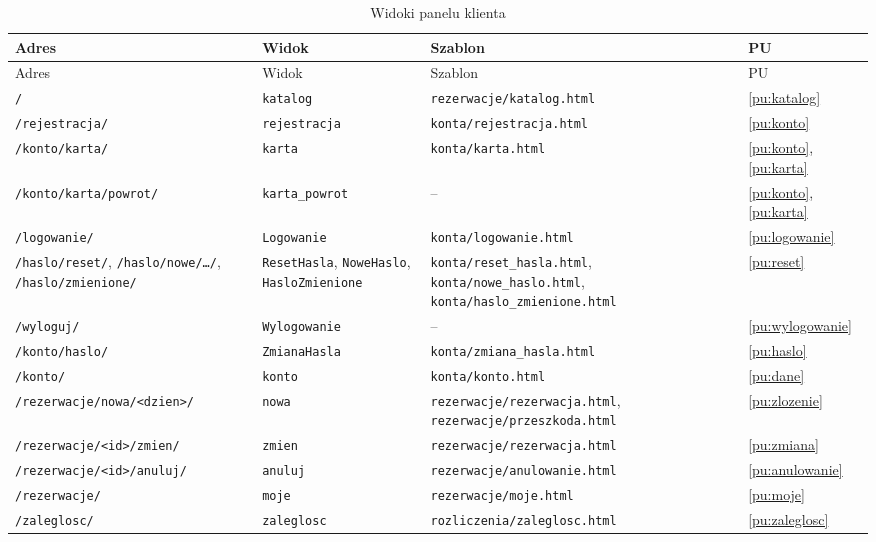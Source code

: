 \documentclass[12pt,a4paper,oneside]{article}
\newcounter{pu}
\begin{document}
\begingroup\small
\begin{longtable}{@{}L{4.35cm}L{2.9cm}L{5.35cm}L{1.9cm}@{}}
	\caption{Widoki panelu klienta}
	\label{tab:widoki-klienta}\\
	\toprule
	Adres & Widok & Szablon & PU \\
	\midrule
	\endfirsthead
	\toprule
	Adres & Widok & Szablon & PU \\
	\midrule
	\endhead
	\texttt{/} & \texttt{katalog} & \texttt{rezerwacje/katalog.html} & \ref{pu:katalog} \\
	\texttt{/rejestracja/} & \texttt{rejestracja} & \texttt{konta/rejestracja.html} & \ref{pu:konto} \\
	\texttt{/konto/karta/} & \texttt{karta} & \texttt{konta/karta.html} & \ref{pu:konto}, \ref{pu:karta} \\
	\texttt{/konto/karta/powrot/} & \texttt{karta\_powrot} & -- & \ref{pu:konto}, \ref{pu:karta} \\
	\texttt{/logowanie/} & \texttt{Logowanie} & \texttt{konta/logowanie.html} & \ref{pu:logowanie} \\
	\texttt{/haslo/reset/}, \texttt{/haslo/nowe/…/}, \texttt{/haslo/zmienione/} & \texttt{ResetHasla}, \texttt{NoweHaslo}, \texttt{HasloZmienione} & \texttt{konta/reset\_hasla.html}, \texttt{konta/nowe\_haslo.html}, \texttt{konta/haslo\_zmienione.html} & \ref{pu:reset} \\
	\texttt{/wyloguj/} & \texttt{Wylogowanie} & -- & \ref{pu:wylogowanie} \\
	\texttt{/konto/haslo/} & \texttt{ZmianaHasla} & \texttt{konta/zmiana\_hasla.html} & \ref{pu:haslo} \\
	\texttt{/konto/} & \texttt{konto} & \texttt{konta/konto.html} & \ref{pu:dane} \\
	\texttt{/rezerwacje/nowa/\allowbreak{}<dzien>/} & \texttt{nowa} & \texttt{rezerwacje/rezerwacja.html}, \texttt{rezerwacje/przeszkoda.html} & \ref{pu:zlozenie} \\
	\texttt{/rezerwacje/<id>/\allowbreak{}zmien/} & \texttt{zmien} & \texttt{rezerwacje/rezerwacja.html} & \ref{pu:zmiana} \\
	\texttt{/rezerwacje/<id>/\allowbreak{}anuluj/} & \texttt{anuluj} & \texttt{rezerwacje/anulowanie.html} & \ref{pu:anulowanie} \\
	\texttt{/rezerwacje/} & \texttt{moje} & \texttt{rezerwacje/moje.html} & \ref{pu:moje} \\
	\texttt{/zaleglosc/} & \texttt{zaleglosc} & \texttt{rozliczenia/zaleglosc.html} & \ref{pu:zaleglosc} \\
	\bottomrule
\end{longtable}
\endgroup
\end{document}
